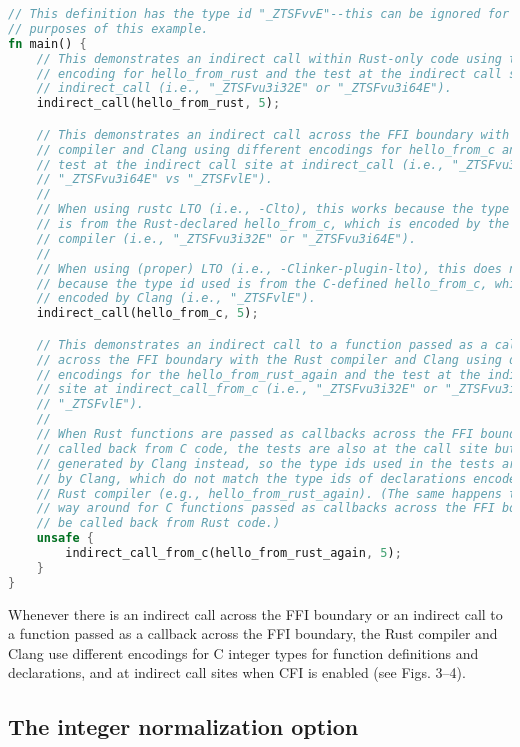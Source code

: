 \documentclass{article}
\begin{document}
\begin{lstlisting}[language=Rust, caption={Example Rust program using Rust integer types and the Rust compiler encoding.}]
// This definition has the type id "_ZTSFvvE"--this can be ignored for the
// purposes of this example.
fn main() {
    // This demonstrates an indirect call within Rust-only code using the same
    // encoding for hello_from_rust and the test at the indirect call site at
    // indirect_call (i.e., "_ZTSFvu3i32E" or "_ZTSFvu3i64E").
    indirect_call(hello_from_rust, 5);

    // This demonstrates an indirect call across the FFI boundary with the Rust
    // compiler and Clang using different encodings for hello_from_c and the
    // test at the indirect call site at indirect_call (i.e., "_ZTSFvu3i32E" or
    // "_ZTSFvu3i64E" vs "_ZTSFvlE").
    //
    // When using rustc LTO (i.e., -Clto), this works because the type id used
    // is from the Rust-declared hello_from_c, which is encoded by the Rust
    // compiler (i.e., "_ZTSFvu3i32E" or "_ZTSFvu3i64E").
    //
    // When using (proper) LTO (i.e., -Clinker-plugin-lto), this does not work
    // because the type id used is from the C-defined hello_from_c, which is
    // encoded by Clang (i.e., "_ZTSFvlE").
    indirect_call(hello_from_c, 5);

    // This demonstrates an indirect call to a function passed as a callback
    // across the FFI boundary with the Rust compiler and Clang using different
    // encodings for the hello_from_rust_again and the test at the indirect call
    // site at indirect_call_from_c (i.e., "_ZTSFvu3i32E" or "_ZTSFvu3i64E" vs
    // "_ZTSFvlE").
    //
    // When Rust functions are passed as callbacks across the FFI boundary to be
    // called back from C code, the tests are also at the call site but
    // generated by Clang instead, so the type ids used in the tests are encoded
    // by Clang, which do not match the type ids of declarations encoded by the
    // Rust compiler (e.g., hello_from_rust_again). (The same happens the other
    // way around for C functions passed as callbacks across the FFI boundary to
    // be called back from Rust code.)
    unsafe {
        indirect_call_from_c(hello_from_rust_again, 5);
    }
}
\end{lstlisting}

Whenever there is an indirect call across the FFI boundary or an indirect call to a function passed as a callback across the FFI boundary, the Rust compiler and Clang use different encodings for C integer types for function definitions and declarations, and at indirect call sites when CFI is enabled (see Figs. 3–4).


\subsection{The integer normalization option}
\end{document}
